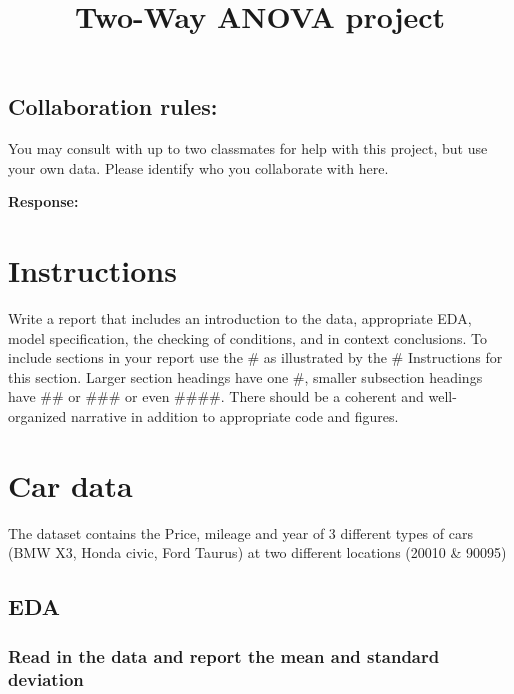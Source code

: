 \documentclass[]{article}
\title{Two-Way ANOVA project}
\author{}
\date{}
\begin{document}
\maketitle

\hypertarget{collaboration-rules}{%
\subsection{Collaboration rules:}\label{collaboration-rules}}

You may consult with up to two classmates for help with this project,
but use your own data. Please identify who you collaborate with here.

\textbf{Response:}

\hypertarget{instructions}{%
\section{Instructions}\label{instructions}}

Write a report that includes an introduction to the data, appropriate
EDA, model specification, the checking of conditions, and in context
conclusions. To include sections in your report use the \# as
illustrated by the \# Instructions for this section. Larger section
headings have one \#, smaller subsection headings have \#\# or \#\#\# or
even \#\#\#\#. There should be a coherent and well-organized narrative
in addition to appropriate code and figures.

\hypertarget{car-data}{%
\section{Car data}\label{car-data}}

The dataset contains the Price, mileage and year of 3 different types of
cars (BMW X3, Honda civic, Ford Taurus) at two different locations
(20010 \& 90095)

\hypertarget{eda}{%
\subsection{EDA}\label{eda}}

\hypertarget{read-in-the-data-and-report-the-mean-and-standard-deviation}{%
\subsubsection{Read in the data and report the mean and standard
deviation}\label{read-in-the-data-and-report-the-mean-and-standard-deviation}}
\end{document}
